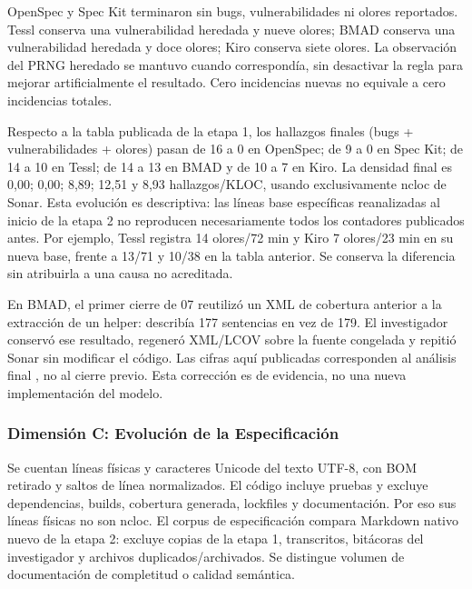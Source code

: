 OpenSpec y Spec Kit terminaron sin bugs, vulnerabilidades ni olores reportados. Tessl conserva una vulnerabilidad heredada y nueve olores; BMAD conserva una vulnerabilidad heredada y doce olores; Kiro conserva siete olores. La observación del PRNG heredado se mantuvo cuando correspondía, sin desactivar la regla para mejorar artificialmente el resultado. Cero incidencias nuevas no equivale a cero incidencias totales.

Respecto a la tabla publicada de la etapa 1, los hallazgos finales (bugs + vulnerabilidades + olores) pasan de 16 a 0 en OpenSpec; de 9 a 0 en Spec Kit; de 14 a 10 en Tessl; de 14 a 13 en BMAD y de 10 a 7 en Kiro. La densidad final es 0,00; 0,00; 8,89; 12,51 y 8,93 hallazgos/KLOC, usando exclusivamente ncloc de Sonar. Esta evolución es descriptiva: las líneas base específicas reanalizadas al inicio de la etapa 2 no reproducen necesariamente todos los contadores publicados antes. Por ejemplo, Tessl registra 14 olores/72 min y Kiro 7 olores/23 min en su nueva base, frente a 13/71 y 10/38 en la tabla anterior. Se conserva la diferencia sin atribuirla a una causa no acreditada.

En BMAD, el primer cierre de 07 reutilizó un XML de cobertura anterior a la extracción de un helper: describía 177 sentencias en vez de 179. El investigador conservó ese resultado, regeneró XML/LCOV sobre la fuente congelada y repitió Sonar sin modificar el código. Las cifras aquí publicadas corresponden al análisis final , no al cierre previo. Esta corrección es de evidencia, no una nueva implementación del modelo.

\subsubsection{Dimensión C: Evolución de la Especificación}

Se cuentan líneas físicas y caracteres Unicode del texto UTF-8, con BOM retirado y saltos de línea normalizados. El código incluye pruebas y excluye dependencias, builds, cobertura generada, lockfiles y documentación. Por eso sus líneas físicas no son ncloc. El corpus de especificación compara Markdown nativo nuevo de la etapa 2: excluye copias de la etapa 1, transcritos, bitácoras del investigador y archivos duplicados/archivados. Se distingue volumen de documentación de completitud o calidad semántica.

